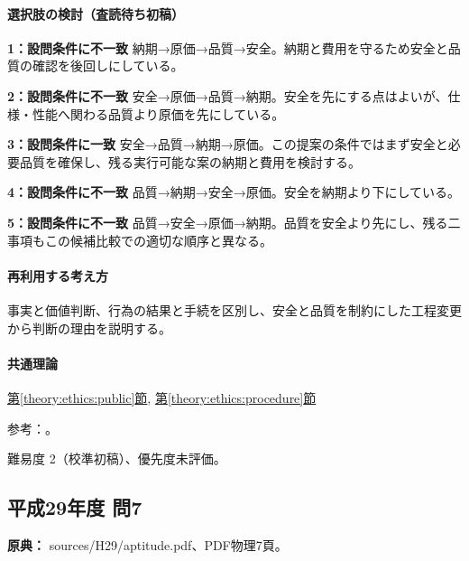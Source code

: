 \paragraph{選択肢の検討（査読待ち初稿）}\mbox{}\par

\noindent\textbf{1：設問条件に不一致} 納期→原価→品質→安全。納期と費用を守るため安全と品質の確認を後回しにしている。\par

\noindent\textbf{2：設問条件に不一致} 安全→原価→品質→納期。安全を先にする点はよいが、仕様・性能へ関わる品質より原価を先にしている。\par

\noindent\textbf{3：設問条件に一致} 安全→品質→納期→原価。この提案の条件ではまず安全と必要品質を確保し、残る実行可能な案の納期と費用を検討する。\par

\noindent\textbf{4：設問条件に不一致} 品質→納期→安全→原価。安全を納期より下にしている。\par

\noindent\textbf{5：設問条件に不一致} 品質→安全→原価→納期。品質を安全より先にし、残る二事項もこの候補比較での適切な順序と異なる。\par

\paragraph{再利用する考え方} 事実と価値判断、行為の結果と手続を区別し、安全と品質を制約にした工程変更から判断の理由を説明する。

\paragraph{共通理論} \hyperref[theory:ethics:public]{第\ref*{theory:ethics:public}節}, \hyperref[theory:ethics:procedure]{第\ref*{theory:ethics:procedure}節}

\par 参考：\cite{ipej_ethics2011}。

\par 難易度 2（校準初稿）、優先度未評価。

\subsection{平成29年度 問7}
\label{q:h29-reg-apt-07}

\noindent\textbf{原典：} sources/H29/aptitude.pdf、PDF物理7頁。


